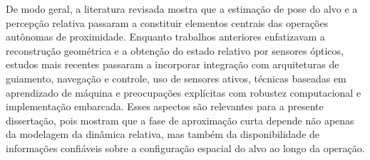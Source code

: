 De modo geral, a literatura revisada mostra que a estimação de pose do alvo e a percepção relativa passaram a constituir elementos centrais das operações autônomas de proximidade. Enquanto trabalhos anteriores enfatizavam a reconstrução geométrica e a obtenção do estado relativo por sensores ópticos, estudos mais recentes passaram a incorporar integração com arquiteturas de guiamento, navegação e controle, uso de sensores ativos, técnicas baseadas em aprendizado de máquina e preocupações explícitas com robustez computacional e implementação embarcada. Esses aspectos são relevantes para a presente dissertação, pois mostram que a fase de aproximação curta depende não apenas da modelagem da dinâmica relativa, mas também da disponibilidade de informações confiáveis sobre a configuração espacial do alvo ao longo da operação.